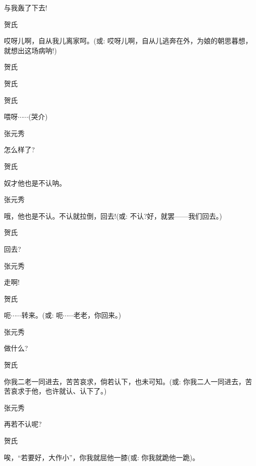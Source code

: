 与我轰了下去!

贺氏

哎呀儿啊，自从我儿离家呵。({\akai 或}: 哎呀儿啊，自从儿逃奔在外，为娘的朝思暮想，就想出这场病呐!)

贺氏


贺氏\hspace{30pt}~


贺氏\hspace{30pt}~

喂呀$\cdots{}\cdots{}$(哭介)

张元秀\hspace{20pt}~

怎么样了?

贺氏\hspace{30pt}~

奴才他也是不认呐。

张元秀

哦，他也是不认。不认就拉倒，回去!({\akai 或}: 不认?好，就罢------我们回去。)

贺氏\hspace{30pt}~

回去?

张元秀\hspace{20pt}~

走啊!

贺氏\hspace{30pt}~

呃$\cdots{}\cdots{}$转来。({\akai 或}: 呃$\cdots{}\cdots{}$老老，你回来。)

张元秀\hspace{20pt}~

做什么?

贺氏

你我二老一同进去，苦苦哀求，倘若认下，也未可知。({\akai 或}: 你我二人一同进去，苦苦哀求于他，也许就认、认下了。)

张元秀\hspace{20pt}~

再若不认呢?

贺氏\hspace{30pt}~

唉，``若要好，大作小''，你我就屈他一膝({\akai 或}: 你我就跪他一跪)。

